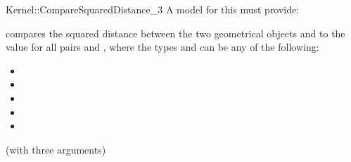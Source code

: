 \begin{ccRefFunctionObjectConcept}{Kernel::CompareSquaredDistance_3}
A model for this must provide:


      {compares the squared distance between the two geometrical objects
         and  to the value }
for all pairs  and , where
the types  and  can be any of the
following:
\begin{itemize}
\item {}
\item {}
\item {}
\item {}
\item {}
\end{itemize}

\ccRefines
{} (with three arguments)

\ccSeeAlso
{} \\
 \\
 \\

\end{ccRefFunctionObjectConcept}
